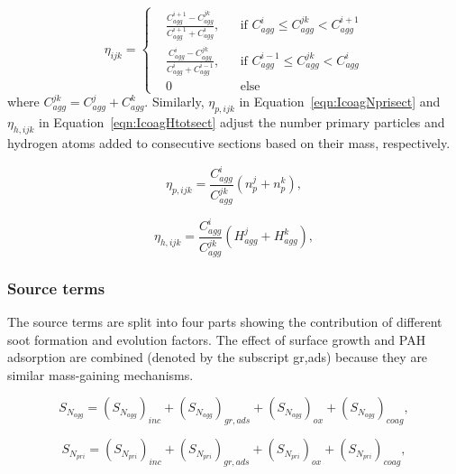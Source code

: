 \begin{equation}
	\eta_{ijk}=
	\left\{
	\begin{aligned}
	&\frac{C^{i+1}_{agg}-C^{jk}_{agg}}{C^{i+1}_{agg}+C^i_{agg}},
	&&
	\text{if } C^i_{agg} \le C^{jk}_{agg} < C^{i+1}_{agg}
	\\
	&\frac{C^{i}_{agg}-C^{jk}_{agg}}{C^{i}_{agg}+C^{i-1}_{agg}}, 
	&&
	\text{if } C^{i-1}_{agg} \le C^{jk}_{agg} < C^{i}_{agg}
	\\
	&0
	&&\text{else}
	\end{aligned}
	\right.
	\label{eqn:etacoag}
\end{equation}
\noindent where ${C^{jk}_{agg}=C^{j}_{agg}+C^{k}_{agg}}$. Similarly, $\eta_{p,ijk}$ in Equation~\eqref{eqn:IcoagNprisect} and $\eta_{h,ijk}$ in Equation~\eqref{eqn:IcoagHtotsect} adjust the number primary particles and hydrogen atoms added to consecutive sections based on their mass, respectively.

\begin{equation}
	\eta_{p,ijk}=
	\frac{C^i_{agg}}{C^{jk}_{agg}}
	\left(
		n^j_p + n^k_p
	\right)
	\label{eqn:etapcoag},
\end{equation}

\begin{equation}
	\eta_{h,ijk}=
	\frac{C^i_{agg}}{C^{jk}_{agg}}
	\left(
	H^j_{agg} + H^k_{agg}
	\right)
	\label{eqn:etahcoag},
\end{equation}

\subsubsection{Source terms}
The source terms are split into four parts showing the contribution of different soot formation and evolution factors. The effect of surface growth and PAH adsorption are combined (denoted by the subscript gr,ads) because they are similar mass-gaining mechanisms.

\begin{equation}
	S_{N_{agg}} = 
	\left(S_{N_{agg}}\right)_{inc}
	+\left(S_{N_{agg}}\right)_{gr, ads}
	+\left(S_{N_{agg}}\right)_{ox}
	+\left(S_{N_{agg}}\right)_{coag}
	\label{eqn:S_Naggsect},
\end{equation}

\begin{equation}
	S_{N_{pri}} = 
	\left(S_{N_{pri}}\right)_{inc}
	+\left(S_{N_{pri}}\right)_{gr, ads}
	+\left(S_{N_{pri}}\right)_{ox}
	+\left(S_{N_{pri}}\right)_{coag}
	\label{eqn:S_Nprisect},
\end{equation}

